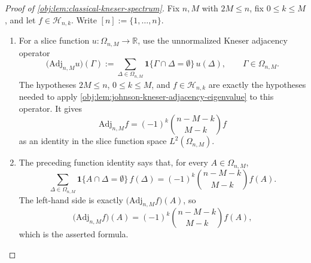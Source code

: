 \begin{proof}[Proof of \cref{obj:lem:classical-kneser-spectrum}]
Fix \(n,M\) with \(2M\le n\), fix \(0\le k\le M\), and let
\(f\in\mathcal H_{n,k}\).  Write \([n]:=\{1,\ldots,n\}\).

\begin{enumerate}
\item For a slice function \(u:\Omega_{n,M}\to\mathbb R\), use the unnormalized
Kneser adjacency operator
\[
\bigl(\mathrm{Adj}_{n,M}u\bigr)(\Gamma)
:=
\sum_{\Delta\in\Omega_{n,M}}
\mathbf 1\{\Gamma\cap\Delta=\emptyset\}\,u(\Delta),
\qquad \Gamma\in\Omega_{n,M}.
\]
The hypotheses \(2M\le n\), \(0\le k\le M\), and
\(f\in\mathcal H_{n,k}\) are exactly the hypotheses needed to apply
\cref{obj:lem:johnson-kneser-adjacency-eigenvalue} to this operator.  It gives
\[
\mathrm{Adj}_{n,M}f
=
(-1)^k\binom{n-M-k}{M-k}f
\]
as an identity in the slice function space \(L^2(\Omega_{n,M})\). %

\item The preceding function identity says that, for every
\(A\in\Omega_{n,M}\),
\[
\sum_{\Delta\in\Omega_{n,M}}
\mathbf 1\{A\cap\Delta=\emptyset\}\,f(\Delta)
=
(-1)^k\binom{n-M-k}{M-k}f(A).
\]
The left-hand side is exactly \(\bigl(\mathrm{Adj}_{n,M}f\bigr)(A)\), so
\[
\bigl(\mathrm{Adj}_{n,M} f\bigr)(A)
=
(-1)^k \binom{n-M-k}{M-k} f(A),
\]
which is the asserted formula. %
\end{enumerate}
\end{proof}
